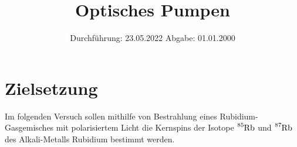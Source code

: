 

\def\Rb#1{\ce{^{#1}Rb}}

\subject{V21}
\title{Optisches Pumpen}
\date{
    Durchführung: 23.05.2022
     \hspace{3em}
    Abgabe: 01.01.2000 %
}


\maketitle
\thispagestyle{empty}
\tableofcontents
\newpage

\section{Zielsetzung}

    Im folgenden Versuch sollen mithilfe von Bestrahlung eines Rubidium-Gasgemisches mit polarisiertem Licht die Kernspins der Isotope $\ce{^{85}Rb}$ und $\ce{^{87}Rb}$ des Alkali-Metalls Rubidium bestimmt werden.


\clearpage


\clearpage

%
%

\clearpage

\printbibliography


